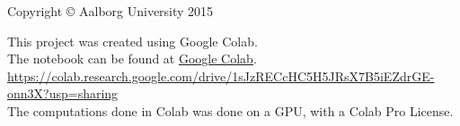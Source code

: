 \documentclass[11pt, a4paper, openright]{report}
\begin{document}
\thispagestyle{empty}
\small
\strut\vfill
\noindent Copyright \copyright{} Aalborg University 2015\par
\vspace{0.2cm}
\noindent This project was created using Google Colab.\\
The notebook can be found at \href{https://colab.research.google.com/drive/1sJzRECcHC5H5JRsX7B5iEZdrGE-onn3X#scrollTo=RUfZZPrGUZoH}{Google Colab}.\\
\url{https://colab.research.google.com/drive/1sJzRECcHC5H5JRsX7B5iEZdrGE-onn3X?usp=sharing} \\
The computations done in Colab was done on a GPU, with a Colab Pro License.
\clearpage


\tableofcontents
\end{document}
